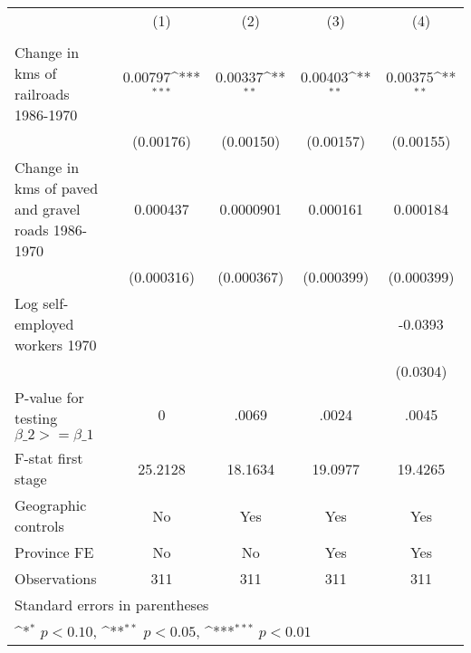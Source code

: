 {
\def\sym#1{\ifmmode^{#1}\else\(^{#1}\)\fi}
\begin{tabular}{l*{4}{c}}
\hline\hline
                &\multicolumn{1}{c}{(1)}&\multicolumn{1}{c}{(2)}&\multicolumn{1}{c}{(3)}&\multicolumn{1}{c}{(4)}\\
                &\multicolumn{1}{c}{}&\multicolumn{1}{c}{}&\multicolumn{1}{c}{}&\multicolumn{1}{c}{}\\
\hline
Change in kms of railroads 1986-1970&  0.00797\sym{***}&  0.00337\sym{**} &  0.00403\sym{**} &  0.00375\sym{**} \\
                &(0.00176)         &(0.00150)         &(0.00157)         &(0.00155)         \\
[1em]
Change in kms of paved and gravel roads 1986-1970& 0.000437         &0.0000901         & 0.000161         & 0.000184         \\
                &(0.000316)         &(0.000367)         &(0.000399)         &(0.000399)         \\
[1em]
Log self-employed workers 1970&                  &                  &                  &  -0.0393         \\
                &                  &                  &                  & (0.0304)         \\
\hline
P-value for testing $\beta\_{2} >= \beta\_{1}$&        0         &    .0069         &    .0024         &    .0045         \\
F-stat first stage&  25.2128         &  18.1634         &  19.0977         &  19.4265         \\
Geographic controls&       No         &      Yes         &      Yes         &      Yes         \\
Province FE     &       No         &       No         &      Yes         &      Yes         \\
Observations    &      311         &      311         &      311         &      311         \\
\hline\hline
\multicolumn{5}{l}{\footnotesize Standard errors in parentheses}\\
\multicolumn{5}{l}{\footnotesize \sym{*} \(p<0.10\), \sym{**} \(p<0.05\), \sym{***} \(p<0.01\)}\\
\end{tabular}
}
